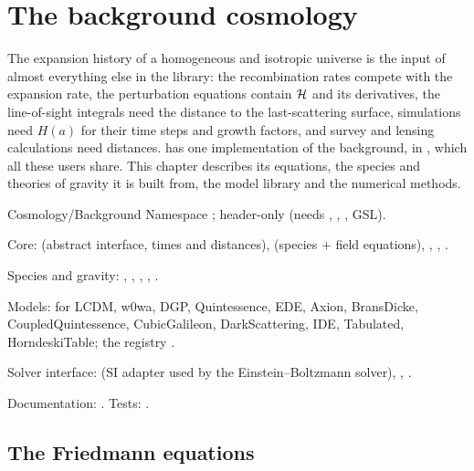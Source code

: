 \chapter{The background cosmology}\label{ch:background}

The expansion history of a homogeneous and isotropic universe is the input of almost everything else in the library:
the recombination rates compete with the expansion rate, the perturbation equations contain $\mathcal{H}$ and its derivatives,
the line-of-sight integrals need the distance to the last-scattering surface, simulations need $H(a)$ for their time
steps and growth factors, and survey and lensing calculations need distances. \fml{} has one implementation of the
background,  in , which all these users share. This chapter describes its
equations, the species and theories of gravity it is built from, the model library and the numerical methods.

\begin{modulebox}{Cosmology/Background}
Namespace ; header-only (needs , , , GSL).\par
Core:  (abstract interface, times and distances),  (species + field
equations), , , .\par
Species and gravity: , , ,
, .\par
Models:  for LCDM, w0wa, DGP, Quintessence, EDE, Axion, BransDicke,
CoupledQuintessence, CubicGalileon, DarkScattering, IDE, Tabulated, HorndeskiTable; the registry .\par
Solver interface:  (SI adapter used by the Einstein--Boltzmann solver),
, .\par
Documentation: . Tests: .
\end{modulebox}

\section{The Friedmann equations}\label{sec:bg-friedmann}


